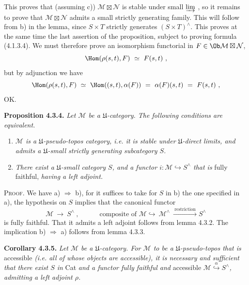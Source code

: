 \noindent This proves that (assuming c)) $\mathcal M\boxtimes\mathcal N$ is stable under small $\varinjlim$ , so it remains to prove that $\mathcal M\boxtimes\mathcal N$ admits a small strictly generating family. This will follow from b) in the lemma, since $S\times T$ strictly generates $(S\times T)^\wedge$. This proves at the same time the last assertion of the proposition, subject to proving formula (4.1.3.4). We must therefore prove an isomorphism functorial in $F\in\Ob\mathcal M\boxtimes\mathcal N$, %
\[
\Hom(\rho(s,t),F)\ \simeq\ F(s,t)\ ,
\]
but by adjunction we have
\[
\Hom(\rho(s,t),F)\ \simeq\ \Hom((s,t),\alpha(F))\ =\ \alpha(F)(s,t)\ =\ F(s,t)\ ,
\]
OK.


\noindent{}\textbf{Proposition 4.3.4.} \textit{Let $\mathcal M$ be a $\mathfrak U$-category. The following conditions are equivalent.}
\begin{enumerate}[label={}]
\item[\textit{a)}] \textit{$\mathcal M$ is a $\mathfrak U$-pseudo-topos category, i.e. it is stable under $\mathfrak U$-direct limits, and admits a $\mathfrak U$-small strictly generating subcategory $S$.}
\item[\textit{b)}] \textit{There exist a $\mathfrak U$-small category $S$, and a functor $i:\mathcal M\hookrightarrow S^\wedge$ that is} fully faithful, \textit{having a left adjoint.}
\end{enumerate}

\noindent\textsc{Proof}. We have a) $\Longrightarrow$ b), for it suffices to take for $S$ in b) the one specified in a), the hypothesis on $S$ implies that the canonical functor
\[
\mathcal M\ \longrightarrow\ S^\wedge\ ,\qquad\quad \text{composite of } \mathcal M\hookrightarrow\ \mathcal M^\wedge\ \xrightarrow{\ \text{restriction}\ }S^\wedge
\]
is fully faithful. That it admits a left adjoint follows from lemma 4.3.2. The implication b) $\Longrightarrow$ a) follows from lemma 4.3.3.

\noindent\textbf{Corollary 4.3.5.} \textit{Let $\mathcal M$ be a $\mathfrak U$-category. For $\mathcal M$ to be a $\mathfrak U$-pseudo-topos that is} accessible \textit{(i.e. all of whose objects are accessible), it is necessary and sufficient that there exist $S$ in} Cat \textit{and a functor fully faithful and} accessible $\mathcal M\overset{\alpha}{\hookrightarrow}S^\wedge$\textit{, admitting a left adjoint $\rho$.}

